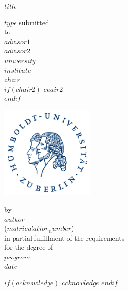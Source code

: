 \documentclass[a4paper,11pt]{article}
\begin{document}
\thispagestyle{empty}
\begin{center}
  {\Large{\bf $title$}} \vspace{0.5cm}

  $type$ submitted \\\vspace{0.5cm}
  to \\\vspace{0.5cm}
  \textbf{$advisor1$} \\
  \textbf{$advisor2$} \\\vspace{0.5cm}
  $university$ \\
  $institute$ \\
  $chair$ \\
  $if(chair2)$ $chair2$ \\ $endif$ \vspace{1cm}

  \includegraphics[width=0.35\textwidth]{HU_Logo_small.png}
  
  by \\\vspace{0.5cm}
  \textbf{$author$} \\
  ($matriculation_number$) \\
  
  \medskip
  \medskip
  in partial fulfillment of the requirements \\
  for the degree of \\
  \textbf{$program$} \\\vspace{0.5cm}
  $date$
  
\end{center}

$if(acknowledge)$
\newpage
$acknowledge$
$endif$
\pagestyle{plain}
\setcounter{page}{1}    %
\end{document}
